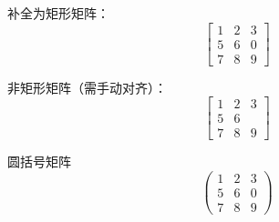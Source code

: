 \documentclass[UTF8]{ctexart}
\begin{document}
补全为矩形矩阵：
\[
\begin{bmatrix}
1 & 2 & 3 \\
5 & 6 & 0 \\
7 & 8 & 9
\end{bmatrix}
\]

非矩形矩阵（需手动对齐）：
\[
\left[
\begin{array}{ccc}
1 & 2 & 3 \\
5 & 6 &   \\
7 & 8 & 9
\end{array}
\right]
\]

圆括号矩阵
\[
\begin{pmatrix}
1 & 2 & 3 \\
5 & 6 & 0 \\
7 & 8 & 9
\end{pmatrix}
\]
\end{document}
